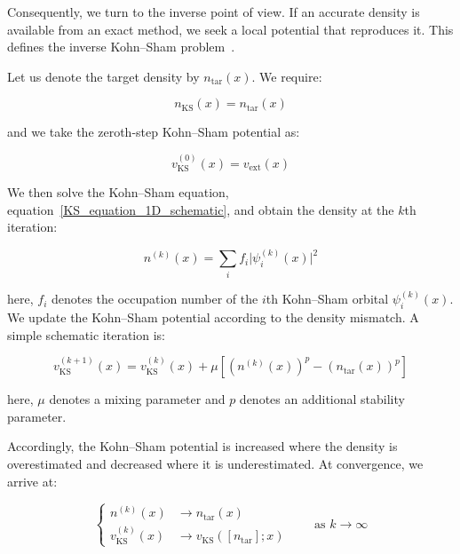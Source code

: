 Consequently, we turn to the inverse point of view.
If an accurate density is available from an exact method, we seek a local potential that reproduces it.
This defines the inverse Kohn--Sham problem~\cite{wang1993construction, astala2006kohn}.

Let us denote the target density by $n_\mathrm{tar}(x)$.
We require:

\begin{equation}
    n_\mathrm{KS}(x)=n_\mathrm{tar}(x)
\label{inverse_KS_target_density_condition}
\end{equation}

and we take the zeroth-step Kohn--Sham potential as:

\begin{equation}
    v_\mathrm{KS}^{(0)}(x)=v_\mathrm{ext}(x)
\label{inverse_KS_initial_guess}
\end{equation}

We then solve the Kohn--Sham equation, equation~\eqref{KS_equation_1D_schematic}, and obtain the density at the $k$th iteration:

\begin{equation}
    n^{(k)}(x)=\sum_i f_i \lvert\psi_i^{(k)}(x)\rvert^2
\label{inverse_KS_density_from_kth_iteration}
\end{equation}

here, $f_i$ denotes the occupation number of the $i$th Kohn--Sham orbital $\psi_i^{(k)}(x)$.
We update the Kohn--Sham potential according to the density mismatch.
A simple schematic iteration is:

\begin{equation}
    v_\mathrm{KS}^{(k+1)}(x) = v_\mathrm{KS}^{(k)}(x)
    + \mu \left[\left(n^{(k)}(x)\right)^p - \left(n_\mathrm{tar}(x)\right)^p\right]
\label{inverse_KS_density_update}
\end{equation}

here, $\mu$ denotes a mixing parameter and $p$ denotes an additional stability parameter.

Accordingly, the Kohn--Sham potential is increased where the density is overestimated and decreased where it is underestimated.
At convergence, we arrive at:

\begin{equation}
\left\{
\begin{aligned}
    n^{(k)}(x)                &\rightarrow n_\mathrm{tar}(x)   \\
    v_\mathrm{KS}^{(k)}(x)    &\rightarrow v_\mathrm{KS}([n_\mathrm{tar}];x)
\end{aligned}\right.
\qquad
\text{as $k\rightarrow\infty$} 
\label{inverse_KS_fixed_point_condition}
\end{equation}

